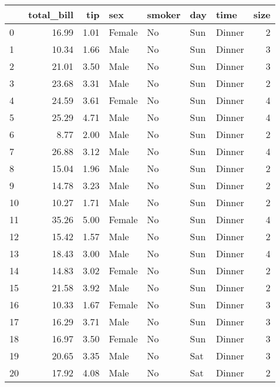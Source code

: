 \begin{tabular}{lrrllllr}
\toprule
{} &  total\_bill &    tip &     sex & smoker &   day &    time &  size \\
\midrule
0   &       16.99 &   1.01 &  Female &     No &   Sun &  Dinner &     2 \\
1   &       10.34 &   1.66 &    Male &     No &   Sun &  Dinner &     3 \\
2   &       21.01 &   3.50 &    Male &     No &   Sun &  Dinner &     3 \\
3   &       23.68 &   3.31 &    Male &     No &   Sun &  Dinner &     2 \\
4   &       24.59 &   3.61 &  Female &     No &   Sun &  Dinner &     4 \\
5   &       25.29 &   4.71 &    Male &     No &   Sun &  Dinner &     4 \\
6   &        8.77 &   2.00 &    Male &     No &   Sun &  Dinner &     2 \\
7   &       26.88 &   3.12 &    Male &     No &   Sun &  Dinner &     4 \\
8   &       15.04 &   1.96 &    Male &     No &   Sun &  Dinner &     2 \\
9   &       14.78 &   3.23 &    Male &     No &   Sun &  Dinner &     2 \\
10  &       10.27 &   1.71 &    Male &     No &   Sun &  Dinner &     2 \\
11  &       35.26 &   5.00 &  Female &     No &   Sun &  Dinner &     4 \\
12  &       15.42 &   1.57 &    Male &     No &   Sun &  Dinner &     2 \\
13  &       18.43 &   3.00 &    Male &     No &   Sun &  Dinner &     4 \\
14  &       14.83 &   3.02 &  Female &     No &   Sun &  Dinner &     2 \\
15  &       21.58 &   3.92 &    Male &     No &   Sun &  Dinner &     2 \\
16  &       10.33 &   1.67 &  Female &     No &   Sun &  Dinner &     3 \\
17  &       16.29 &   3.71 &    Male &     No &   Sun &  Dinner &     3 \\
18  &       16.97 &   3.50 &  Female &     No &   Sun &  Dinner &     3 \\
19  &       20.65 &   3.35 &    Male &     No &   Sat &  Dinner &     3 \\
20  &       17.92 &   4.08 &    Male &     No &   Sat &  Dinner &     2 \\

\end{tabular}
